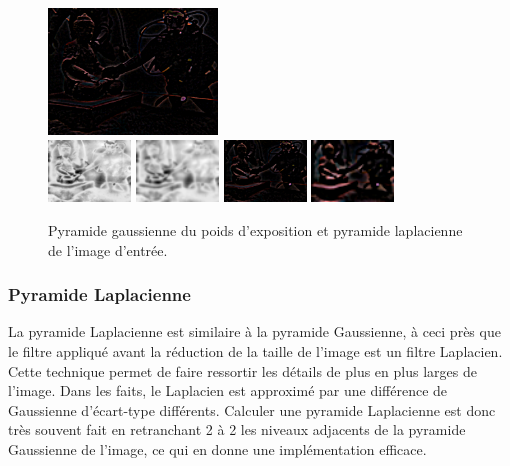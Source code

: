 \documentclass[twoside]{article}
\begin{document}
\begin{figure}
  \includegraphics[width=0.4\textwidth]{Support/laplacian2.png}\\
  \vspace{0.1cm}
  \includegraphics[width=0.196\textwidth]{Support/gaussian3.png}
  \includegraphics[width=0.196\textwidth]{Support/gaussian4.png}
  \vspace{0.1cm}
  \includegraphics[width=0.196\textwidth]{Support/laplacian3.png}
  \includegraphics[width=0.196\textwidth]{Support/laplacian4.png}

  \caption{Pyramide gaussienne du poids d'exposition et pyramide laplacienne de l'image d'entrée.}
\end{figure}


\subsubsection{Pyramide Laplacienne}
La pyramide Laplacienne est similaire à la pyramide Gaussienne, à ceci près que le filtre appliqué avant la réduction de la taille de l'image est un filtre Laplacien. Cette technique permet de faire ressortir les détails de plus en plus larges de l'image. Dans les faits, le Laplacien est approximé par une différence de Gaussienne d'écart-type différents. Calculer une pyramide Laplacienne est donc très souvent fait en retranchant 2 à 2 les niveaux adjacents de la pyramide Gaussienne de l'image, ce qui en donne une implémentation efficace.
\end{document}
